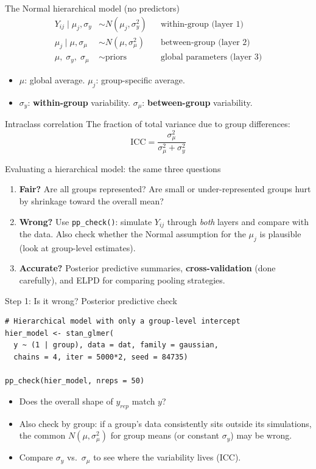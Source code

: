 \documentclass[aspectratio=43,11pt]{beamer}
\begin{document}
\begin{frame}{The Normal hierarchical model (no predictors)}
  \begin{align*}
    Y_{ij}\mid\mu_j,\sigma_y &\sim N(\mu_j,\sigma_y^2) &&\text{within-group (layer 1)}\\
    \mu_j\mid\mu,\sigma_\mu &\sim N(\mu,\sigma_\mu^2) &&\text{between-group (layer 2)}\\
    \mu,\;\sigma_y,\;\sigma_\mu &\sim \text{priors} &&\text{global parameters (layer 3)}
  \end{align*}
  \begin{itemize}
    \item $\mu$: global average. $\mu_j$: group-specific average.
    \item $\sigma_y$: \textbf{within-group} variability. $\sigma_\mu$: \textbf{between-group} variability.
  \end{itemize}
  \begin{block}{Intraclass correlation}
    The fraction of total variance due to group differences:
    \[
      \text{ICC}=\frac{\sigma_\mu^2}{\sigma_\mu^2+\sigma_y^2}
    \]
  \end{block}
\end{frame}

\begin{frame}{Evaluating a hierarchical model: the same three questions}
  \begin{enumerate}
    \item \textbf{Fair?} Are all groups represented? Are small or under-represented groups hurt by shrinkage toward the overall mean?
    \item \textbf{Wrong?} Use \texttt{pp\_check()}: simulate $Y_{ij}$ through \emph{both} layers and compare with the data. Also check whether the Normal assumption for the $\mu_j$ is plausible (look at group-level estimates).
    \item \textbf{Accurate?} Posterior predictive summaries, \textbf{cross-validation} (done carefully), and ELPD for comparing pooling strategies.
  \end{enumerate}
\end{frame}

\begin{frame}[fragile]{Step 1: Is it wrong? Posterior predictive check}
\begin{lstlisting}
# Hierarchical model with only a group-level intercept
hier_model <- stan_glmer(
  y ~ (1 | group), data = dat, family = gaussian,
  chains = 4, iter = 5000*2, seed = 84735)

pp_check(hier_model, nreps = 50)
\end{lstlisting}
  \begin{itemize}
    \item Does the overall shape of $y_{rep}$ match $y$?
    \item Also check by group: if a group's data consistently sits outside its simulations, the common $N(\mu,\sigma_\mu^2)$ for group means (or constant $\sigma_y$) may be wrong.
    \item Compare $\sigma_y$ vs.\ $\sigma_\mu$ to see where the variability lives (ICC).
  \end{itemize}
\end{frame}
\end{document}
